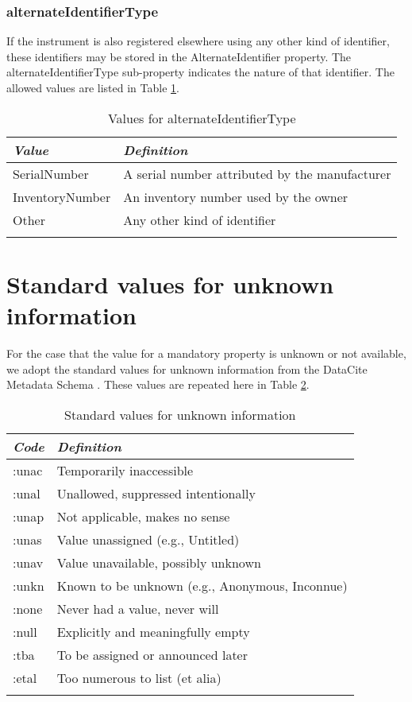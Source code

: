 \documentclass[titlepage=true,twoside=false,DIV=13]{scrartcl}
\begin{document}
\subsubsection{alternateIdentifierType}

If the instrument is also registered elsewhere using any other kind of
identifier, these identifiers may be stored in the AlternateIdentifier
property.  The alternateIdentifierType sub-property indicates the
nature of that identifier.  The allowed values are listed in Table
\ref{tab:schema:values:alternateIdentifierType}.

\begin{longtable}{|l|l|}
  \hline
  \emph{Value} & \emph{Definition} \\
  \hline \endhead
  \hline \endfoot\endlastfoot
  SerialNumber    & A serial number attributed by the manufacturer \\
  InventoryNumber & An inventory number used by the owner \\
  Other           & Any other kind of identifier \\
  \hline
  \caption{Values for alternateIdentifierType}
  \label{tab:schema:values:alternateIdentifierType}
\end{longtable}

\appendix

\section{Standard values for unknown information}
\label{appendix:unknown}

For the case that the value for a mandatory property is unknown or not
available, we adopt the standard values for unknown information from
the DataCite Metadata Schema \cite{datacite:schema}.  These values are
repeated here in Table \ref{tab:appendix:unknown}.

\begin{longtable}{|l|l|}
  \hline
  \emph{Code} & \emph{Definition} \\
  \hline \endhead
  \hline \endfoot\endlastfoot
  :unac & Temporarily inaccessible \\
  :unal & Unallowed, suppressed intentionally \\
  :unap & Not applicable, makes no sense \\
  :unas & Value unassigned (e.g., Untitled) \\
  :unav & Value unavailable, possibly unknown \\
  :unkn & Known to be unknown (e.g., Anonymous, Inconnue) \\
  :none & Never had a value, never will \\
  :null & Explicitly and meaningfully empty \\
  :tba  & To be assigned or announced later \\
  :etal & Too numerous to list (et alia) \\
  \hline
  \caption{Standard values for unknown information}
  \label{tab:appendix:unknown}
\end{longtable}
\end{document}
